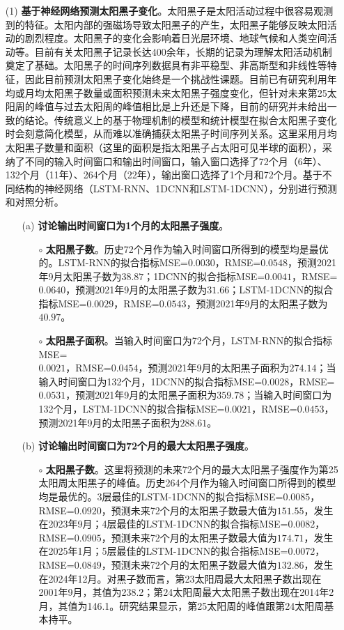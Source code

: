 \begin{enumerate}
  \item[(1)] \textbf{基于神经网络预测太阳黑子变化}。太阳黑子是太阳活动过程中很容易观测到的特征。太阳内部的强磁场导致太阳黑子的产生，太阳黑子能够反映太阳活动的剧烈程度。太阳黑子的变化会影响着日光层环境、地球气候和人类空间活动等。目前有关太阳黑子记录长达400余年，长期的记录为理解太阳活动机制奠定了基础。太阳黑子的时间序列数据具有非平稳型、非高斯型和非线性等特征，因此目前预测太阳黑子变化始终是一个挑战性课题。目前已有研究利用年均或月均太阳黑子数量或面积预测未来太阳黑子强度变化，但针对未来第25太阳周的峰值与过去太阳周的峰值相比是上升还是下降，目前的研究并未给出一致的结论。传统意义上的基于物理机制的模型和统计模型在拟合太阳黑子变化时会刻意简化模型，从而难以准确捕获太阳黑子时间序列关系。这里采用月均太阳黑子数量和面积（这里的面积是指太阳黑子占太阳可见半球的面积），采纳了不同的输入时间窗口和输出时间窗口，输入窗口选择了72个月（6年）、132个月（11年）、264个月（22年），输出窗口选择了1个月和72个月。基于不同结构的神经网络（LSTM-RNN、1DCNN和LSTM-1DCNN），分别进行预测和对照分析。
  \begin{itemize}
    \item[(a)] \textbf{讨论输出时间窗口为1个月的太阳黑子强度}。
    \begin{itemize}
      \item[$\circ$] \textbf{太阳黑子数}。历史72个月作为输入时间窗口所得到的模型均是最优的。LSTM-RNN的拟合指标MSE=$0.0030$，RMSE=$0.0548$，预测2021年9月太阳黑子数为$38.87$；1DCNN的拟合指标MSE=$0.0041$，RMSE=$0.0640$，预测2021年9月的太阳黑子数为$31.66$；LSTM-1DCNN的拟合指标MSE=$0.0029$，RMSE=$0.0543$，预测2021年9月的太阳黑子数为$40.97$。
      \item[$\circ$] \textbf{太阳黑子面积}。当输入时间窗口为72个月，LSTM-RNN的拟合指标MSE=\\$0.0021$，RMSE=$0.0454$，预测2021年9月的太阳黑子面积为$274.14$；当输入时间窗口为132个月，1DCNN的拟合指标MSE=$0.0028$，RMSE=$0.0531$，预测2021年9月的太阳黑子面积为$359.78$；当输入时间窗口为132个月，LSTM-1DCNN的拟合指标MSE=$0.0021$，RMSE=$0.0453$，预测2021年9月的太阳黑子面积为$288.61$。
    \end{itemize}
    \item[(b)] \textbf{讨论输出时间窗口为72个月的最大太阳黑子强度}。
    \begin{itemize}
      \item[$\circ$] \textbf{太阳黑子数}。这里将预测的未来72个月的最大太阳黑子强度作为第25太阳周太阳黑子的峰值。历史264个月作为输入时间窗口所得到的模型均是最优的。3层最佳的LSTM-1DCNN的拟合指标MSE=$0.0085$，RMSE=$0.0920$，预测未来72个月的太阳黑子数最大值为$151.55$，发生在2023年9月；4层最佳的LSTM-1DCNN的拟合指标MSE=$0.0082$，RMSE=$0.0905$，预测未来72个月的太阳黑子数最大值为$174.71$，发生在2025年1月；5层最佳的LSTM-1DCNN的拟合指标MSE=$0.0072$，RMSE=$0.0849$，预测未来72个月的太阳黑子数最大值为$132.86$，发生在2024年12月。对黑子数而言，第23太阳周最大太阳黑子数出现在2001年9月，其值为238.2；第24太阳周最大太阳黑子数出现在2014年2月，其值为146.1。研究结果显示，第25太阳周的峰值跟第24太阳周基本持平。 

\end{itemize}
\end{itemize}
\end{enumerate}
